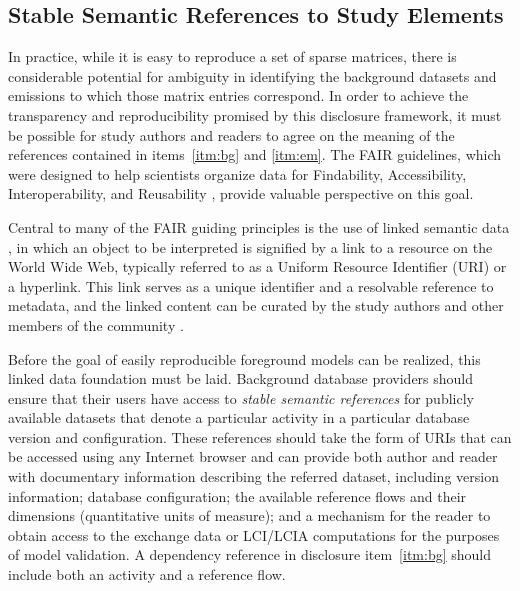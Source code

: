 \subsection{Stable Semantic References to Study Elements}

In practice, while it is easy to reproduce a set of sparse matrices, there is considerable potential for ambiguity in identifying the background datasets and emissions to which those matrix entries correspond.
In order to achieve the transparency and reproducibility promised by this disclosure framework, it must be possible for study authors and readers to agree on the meaning of the references contained in items~\ref{itm:bg} and \ref{itm:em}.
The FAIR guidelines, which were designed to help scientists organize data for Findability, Accessibility, Interoperability, and Reusability \citep{Wilkinson_2016}, provide valuable perspective on this goal.

Central to many of the FAIR guiding principles is the use of linked semantic data \citep{Bizer_2009}, in which an object to be interpreted is signified by a link to a resource on the World Wide Web, typically referred to as a Uniform Resource Identifier (URI) or a hyperlink.  This link serves as a unique identifier and a resolvable reference to metadata, and the linked content can be  curated by the study authors and other members of the community \citep{Khan_2011}.


Before the goal of easily reproducible foreground models can be realized, this linked data foundation must be laid.  Background database providers should ensure that their users have access to \emph{stable semantic references} for publicly available datasets that denote a particular activity in a particular database version and configuration.  These references should take the form of URIs that can be accessed using any Internet browser and can provide both author and reader with documentary information describing the referred dataset, including version information; database configuration; the available reference flows and their dimensions (quantitative units of measure); and a mechanism for the reader to obtain access to the exchange data or LCI/LCIA computations for the purposes of model validation.  A dependency reference in disclosure item~\ref{itm:bg} should include both an activity and a reference flow.


